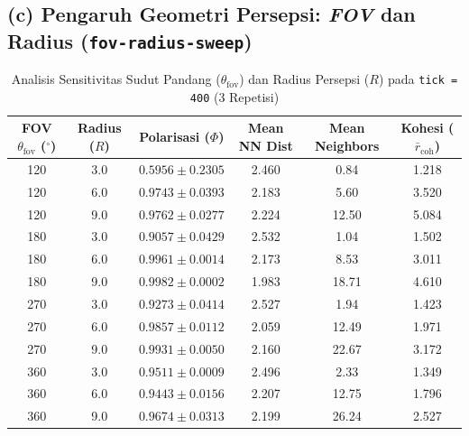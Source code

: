\documentclass[11pt,a4paper]{article}
\begin{document}
\subsection*{(c) Pengaruh Geometri Persepsi: \textit{FOV} dan Radius (\texttt{fov-radius-sweep})}
\begin{table}[H]
\centering
\small
\setlength{\tabcolsep}{6pt}
\begin{tabular}{cccccc}
\toprule
\textbf{FOV $\theta_{\text{fov}}$ ($^\circ$)} & \textbf{Radius ($R$)} & \textbf{Polarisasi ($\Phi$)} & \textbf{Mean NN Dist} & \textbf{Mean Neighbors} & \textbf{Kohesi ($\bar{r}_{\text{coh}}$)} \\
\midrule
120 & 3.0 & $0.5956 \pm 0.2305$ & 2.460 & 0.84  & 1.218 \\
120 & 6.0 & $0.9743 \pm 0.0393$ & 2.183 & 5.60  & 3.520 \\
120 & 9.0 & $0.9762 \pm 0.0277$ & 2.224 & 12.50 & 5.084 \\
\midrule
180 & 3.0 & $0.9057 \pm 0.0429$ & 2.532 & 1.04  & 1.502 \\
180 & 6.0 & $0.9961 \pm 0.0014$ & 2.173 & 8.53  & 3.011 \\
180 & 9.0 & $0.9982 \pm 0.0002$ & 1.983 & 18.71 & 4.610 \\
\midrule
270 & 3.0 & $0.9273 \pm 0.0414$ & 2.527 & 1.94  & 1.423 \\
270 & 6.0 & $0.9857 \pm 0.0112$ & 2.059 & 12.49 & 1.971 \\
270 & 9.0 & $0.9931 \pm 0.0050$ & 2.160 & 22.67 & 3.172 \\
\midrule
360 & 3.0 & $0.9511 \pm 0.0009$ & 2.496 & 2.33  & 1.349 \\
360 & 6.0 & $0.9443 \pm 0.0156$ & 2.207 & 12.75 & 1.796 \\
360 & 9.0 & $0.9674 \pm 0.0313$ & 2.199 & 26.24 & 2.527 \\
\bottomrule
\end{tabular}
\caption{Analisis Sensitivitas Sudut Pandang ($\theta_{\text{fov}}$) dan Radius Persepsi ($R$) pada \texttt{tick = 400} (3 Repetisi)}
\label{tab:fov_sweep}
\end{table}
\end{document}
